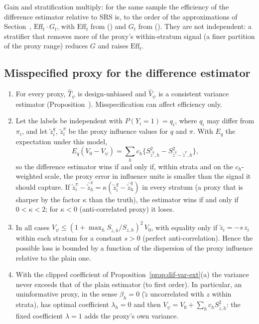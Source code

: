 Gain and stratification multiply: for the same sample the efficiency of the difference estimator relative to SRS is, to the order of the
approximations of Section~, $\mathrm{Eff}_t\cdot G_t$, with $\mathrm{Eff}_t$ from
() and $G_t$ from (). They are not independent: a stratifier that
removes more of the proxy's within-stratum signal (a finer partition of the proxy range) reduces $G$ and raises $\mathrm{Eff}_t$.

\subsection{Misspecified proxy for the difference estimator}\label{si:theory-dif-proxy}

\begin{proposition}\label{prop:dif-proxy}
\begin{enumerate}
\item[(a)] For every proxy, $\hat T_\psi$ is design-unbiased and $\hat V_\psi$ is a consistent variance estimator
(Proposition~). Misspecification can affect efficiency only.
\item[(b)] Let the labels be independent with $P(Y_i=1)=q_i$, where $q_i$ may differ from $\pi_i$, and let $\tilde z^{q}_i$, $\tilde z^{\pi}_i$ be the proxy
influence values for $q$ and $\pi$. With $E_q$ the expectation under this model,
\begin{equation}\label{eq:dif-misspec}
E_q(V_0-V_\psi)=\sum_hc_h\Big\{S^2_{\tilde z^{q},h}-S^2_{\tilde z^{q}-\tilde z^{\pi},h}\Big\},
\end{equation}
so the difference estimator wins if and only if, within strata and on the $c_h$-weighted scale, the proxy error in influence units is smaller than the signal it
should capture. If $\tilde z^{\pi}_i-\bar{\tilde z}^{\pi}_h=\kappa(\tilde z^{q}_i-\bar{\tilde z}^{q}_h)$ in every stratum (a proxy that is sharper by the factor
$\kappa$ than the truth), the estimator wins if and only if $0<\kappa<2$; for $\kappa<0$ (anti-correlated proxy) it loses.
\item[(c)] In all cases $V_\psi\le(1+\max_hS_{\tilde z,h}/S_{z,h})^2\,V_0$, with equality only if $\tilde z_i=-s\,z_i$ within each stratum
for a constant $s>0$ (perfect anti-correlation). Hence the possible loss is bounded by a function of the dispersion of the proxy influence relative to the plain one.
\item[(d)] With the clipped coefficient of Proposition~\ref{prop:dif-var-ext}(a) the variance never exceeds that of the plain estimator
(to first order). In particular, an uninformative proxy, in the sense $\beta_h=0$ ($\tilde z$ uncorrelated with $z$ within strata), has optimal coefficient $\lambda_h=0$ and
then $V_\psi=V_0+\sum_hc_hS^2_{\tilde z,h}$: the fixed coefficient $\lambda=1$ adds the proxy's own variance.
\end{enumerate}
\end{proposition}

